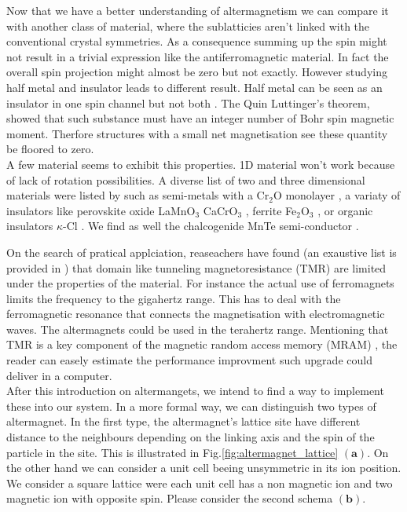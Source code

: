 \documentclass[../main.tex]{main.tex}
\begin{document}
Now that we have a better understanding of altermagnetism we can compare it with another class of material, where the sublatticies
aren't linked with the conventional crystal symmetries.
As a consequence summing up the spin might not result in a trivial expression like the antiferromagnetic material. In fact the overall
spin projection might almost be zero but not exactly. However studying half metal and insulator leads to different result.
Half metal can be seen as an insulator in one spin channel 
but not both \cite{Mazin2024}. The Quin Luttinger's theorem, showed that such substance must have an integer number of Bohr spin
magnetic moment. Therfore structures with a small net magnetisation see these quantity be floored to zero. \\

A few material seems to exhibit this properties. 1D material won't work because of lack of rotation possibilities. A diverse list of two and three dimensional 
materials were listed by \cite{Smejkal2022} such as semi-metals with a Cr$_2$O monolayer \cite{Chen_2023}, a variaty of insulators like 
 perovskite oxide LaMnO$_3$ \cite{Yuan2021} CaCrO$_3$ \cite{Naka2021}, ferrite  Fe$_2$O$_3$ \cite{Smejkal2022_2}, or organic insulators $\kappa$-Cl \cite{Naka2019}.
We find as well the chalcogenide MnTe semi-conductor \cite{Smejkal2022_2}.

On the search of pratical applciation, reaseachers have found (an exaustive list is provided in \cite{Mazin2024}) that
domain like tunneling magnetoresistance (TMR) are limited under the properties of the material. For instance the actual use 
of ferromagnets limits the frequency to the gigahertz range.
This has to deal with the ferromagnetic resonance that connects 
the magnetisation with electromagnetic waves. The altermagnets could be used in the terahertz range. 
Mentioning that TMR is a key component of the magnetic random access memory (MRAM) \cite{OSullivan2004}\cite{Yadav2022}, the reader can easely estimate the performance
improvment such upgrade could deliver in a computer.\\
 
After this introduction on altermangets, we intend to find a way to implement these into our system. In a more formal way, we can
distinguish two types of altermagnet.
In the first type, the altermagnet's lattice site have different distance to the neighbours depending on the linking axis and the 
spin of the particle in the site. This is illustrated in Fig.\ref{fig:altermagnet_lattice} $(\bm{a})$. On the other hand we can consider a unit cell beeing unsymmetric
in its ion position. We consider a square lattice were each unit cell has a non magnetic ion and two magnetic ion with opposite spin.
Please consider the second schema $(\bm{b})$.\\
\end{document}
